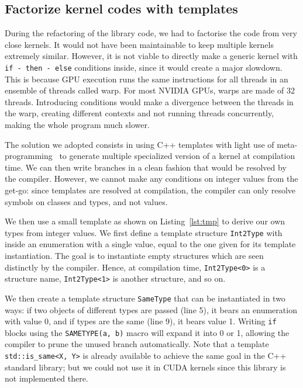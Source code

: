 
\subsection{Factorize kernel codes with templates}

During the refactoring of the library code, we had to factorise the code from very close kernels. It would not have been maintainable to keep multiple kernels extremely similar. However, it is not viable to directly make a generic kernel with \verb|if - then - else| conditions inside, since it would create a major slowdown. This is because GPU execution runs the same instructions for all threads in an ensemble of threads called warp. For most NVIDIA GPUs, warps are made of 32 threads. Introducing conditions would make a divergence between the threads in the warp, creating different contexts and not running threads concurrently, making the whole program much slower.

The solution we adopted consists in using C++ templates with light use of meta-programming~\cite{wikibook:tmp} to generate multiple specialized version of a kernel at compilation time. We can then write branches in a clean fashion that would be resolved by the compiler. However, we cannot make any conditions on integer values from the get-go: since templates are resolved at compilation, the compiler can only resolve symbols on classes and types, and not values. 

We then use a small template as shown on Listing~\ref{lst:tmp} to derive our own types from integer values. We first define a template structure \verb|Int2Type| with inside an enumeration with a single value, equal to the one given for its template instantiation. The goal is to instantiate empty structures which are seen distinctly by the compiler. Hence, at compilation time, \verb|Int2Type<0>| is a structure name, \verb|Int2Type<1>| is another structure, and so on.

We then create a template structure \verb|SameType| that can be instantiated in two ways: if two objects of different types are passed (line 5), it bears an enumeration with value 0, and if types are the same (line 9), it bears value 1. Writing \verb|if| blocks using the \verb|SAMETYPE(a, b)| macro will expand it into 0 or 1, allowing the compiler to prune the unused branch automatically. Note that a template \verb|std::is_same<X, Y>| is already available to achieve the same goal in the C++ standard library; but we could not use it in CUDA kernels since this library is not implemented there.

